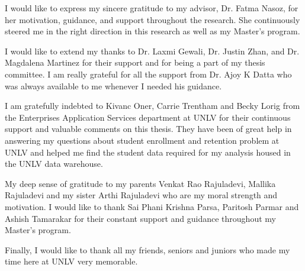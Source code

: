 \documentclass[11pt,openright]{report}
\begin{document}


\begin{thesisacknowledgments}
I would like to express my sincere gratitude to my advisor, Dr. Fatma Nasoz, for her motivation, guidance, and support throughout the research. She continuously steered me in the right direction in this research as well as my Master's program.

I would like to extend my thanks to Dr. Laxmi Gewali, Dr. Justin Zhan, and Dr. Magdalena Martinez for their support and for being a part of my thesis committee. I am really grateful for all the support from Dr. Ajoy K Datta who was always available to me whenever I needed his guidance.

I am gratefully indebted to Kivanc Oner, Carrie Trentham and Becky Lorig from the Enterprises Application Services department at UNLV for their continuous support and valuable comments on this thesis. They have been of great help in  answering my questions about student enrollment and retention problem at UNLV and helped me find the student data required for my analysis housed in the UNLV data warehouse.

My deep sense of gratitude to my parents Venkat Rao Rajuladevi, Mallika Rajuladevi and my sister Arthi Rajuladevi who are my moral strength and motivation. I would like to thank Sai Phani Krishna Parsa, Paritosh Parmar and Ashish Tamarakar for their constant support and guidance throughout my Master's program.

Finally, I would like to thank all my friends, seniors and juniors who made my time here at UNLV very memorable. 
\end{thesisacknowledgments}

\pagestyle{plain}

\tableofcontents
\clearpage
\listoftables
\clearpage
\listoffigures
\clearpage
\clearpage
\end{document}
